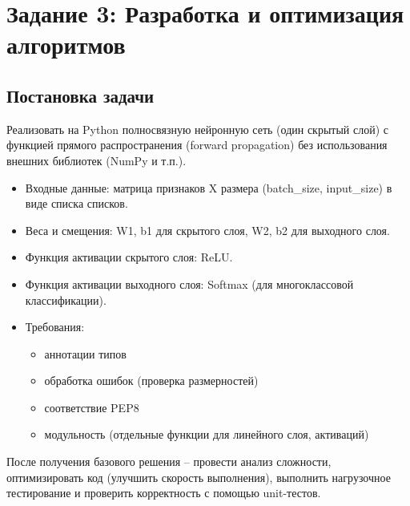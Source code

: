 \newpage
\section*{Задание 3: Разработка и оптимизация алгоритмов}
\subsection{Постановка задачи}
\noindent
Реализовать на Python полносвязную нейронную сеть (один скрытый слой) с функцией
прямого распространения (forward propagation) без использования внешних библиотек (NumPy и т.п.).
\begin{itemize}
	\item Входные данные: матрица признаков X размера (batch\_size, input\_size) в виде списка списков.
	\item Веса и смещения: W1, b1 для скрытого слоя, W2, b2 для выходного слоя.
	\item Функция активации скрытого слоя: ReLU.
	\item Функция активации выходного слоя: Softmax (для многоклассовой классификации).
	\item Требования:
	\begin{itemize}
		\item аннотации типов
		\item обработка ошибок (проверка размерностей)
		\item соответствие PEP8
		\item модульность (отдельные функции для линейного слоя, активаций)
	\end{itemize}
\end{itemize}
После получения базового решения – провести анализ сложности, оптимизировать код (улучшить скорость выполнения), 
выполнить нагрузочное тестирование и проверить корректность с помощью unit-тестов.
\newpage

